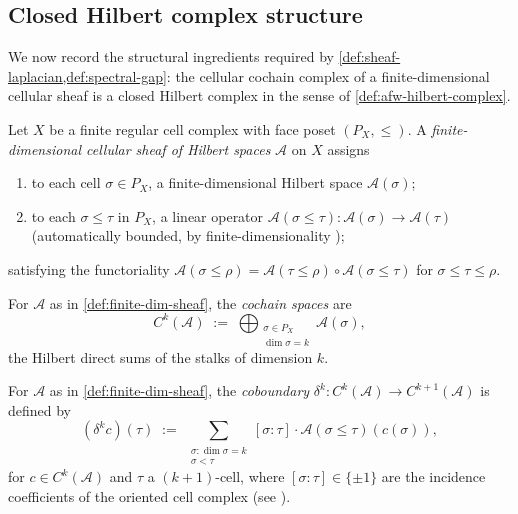 \subsection{Closed Hilbert complex structure}\label{subsec:sheafbw-hilbert-complex}

We now record the structural ingredients required by
\cref{def:sheaf-laplacian,def:spectral-gap}: the cellular cochain
complex of a finite-dimensional cellular sheaf is a closed Hilbert
complex in the sense of \cref{def:afw-hilbert-complex}.

\begin{definition}\label{def:finite-dim-sheaf}
Let $X$ be a finite regular cell complex with face poset
$(P_X, \le)$. A \emph{finite-dimensional cellular sheaf of Hilbert
spaces} $\mathscr{A}$ on $X$ assigns
\begin{enumerate}[label=(\alph*)]
  \item to each cell $\sigma \in P_X$, a finite-dimensional Hilbert
        space $\mathscr{A}(\sigma)$;
  \item to each $\sigma \le \tau$ in $P_X$, a linear operator
        $\mathscr{A}(\sigma \le \tau) :
        \mathscr{A}(\sigma) \to \mathscr{A}(\tau)$ (automatically
        bounded, by finite-dimensionality \cite[\S III.5]{ReedSimonI});
\end{enumerate}
satisfying the functoriality $\mathscr{A}(\sigma \le \rho) =
\mathscr{A}(\tau \le \rho) \circ \mathscr{A}(\sigma \le \tau)$ for
$\sigma \le \tau \le \rho$.
\end{definition}

\begin{definition}\label{def:cochain-space}
For $\mathscr{A}$ as in \cref{def:finite-dim-sheaf}, the
\emph{cochain spaces} are
\[
  C^k(\mathscr{A}) \;:=\;
  \bigoplus_{\substack{\sigma \in P_X \\ \dim \sigma = k}}
  \mathscr{A}(\sigma),
\]
the Hilbert direct sums of the stalks of dimension $k$.
\end{definition}

\begin{definition}[Coboundary]\label{def:coboundary}
For $\mathscr{A}$ as in \cref{def:finite-dim-sheaf}, the
\emph{coboundary} $\delta^k : C^k(\mathscr{A}) \to C^{k+1}(\mathscr{A})$
is defined by
\[
  (\delta^k c)(\tau) \;:=\;
  \sum_{\substack{\sigma : \dim \sigma = k \\ \sigma < \tau}}
  [\sigma : \tau] \cdot \mathscr{A}(\sigma \le \tau)\!\left(c(\sigma)\right),
\]
for $c \in C^k(\mathscr{A})$ and $\tau$ a $(k+1)$-cell, where
$[\sigma : \tau] \in \{\pm 1\}$ are the incidence coefficients of
the oriented cell complex (see \cite[\S 2.1]{Hatcher2002}).
\end{definition}

